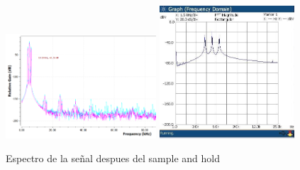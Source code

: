 \documentclass[../../ASSD_TP1_G7.tex]{subfiles}
\begin{document}
\begin{figure}[H]
\centering
{}
{\includegraphics[width=0.5\textwidth]{figures/llsyhsimesp.PNG}}
{\includegraphics[width=0.45\textwidth]{figures/syh_llave.jpeg}}
\caption{Espectro de la se\~nal despues del sample and hold}
\end{figure}
\end{document}
